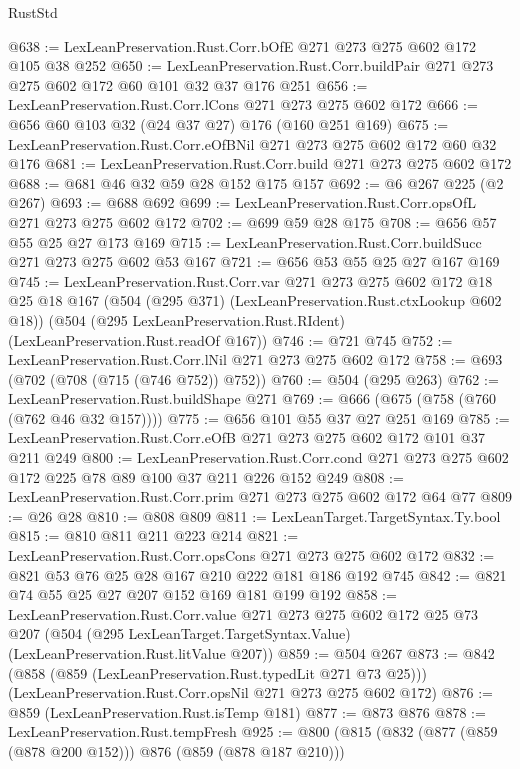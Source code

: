 \begin{lexlean}{RustStd}
\begin{coremodule}
@638 := LexLeanPreservation.Rust.Corr.bOfE @271 @273 @275 @602 @172 @105 @38 @252
@650 := LexLeanPreservation.Rust.Corr.buildPair @271 @273 @275 @602 @172 @60 @101 @32 @37 @176 @251
@656 := LexLeanPreservation.Rust.Corr.lCons @271 @273 @275 @602 @172
@666 := @656 @60 @103 @32 (@24 @37 @27) @176 (@160 @251 @169)
@675 := LexLeanPreservation.Rust.Corr.eOfBNil @271 @273 @275 @602 @172 @60 @32 @176
@681 := LexLeanPreservation.Rust.Corr.build @271 @273 @275 @602 @172
@688 := @681 @46 @32 @59 @28 @152 @175 @157
@692 := @6 @267 @225 (@2 @267)
@693 := @688 @692
@699 := LexLeanPreservation.Rust.Corr.opsOfL @271 @273 @275 @602 @172
@702 := @699 @59 @28 @175
@708 := @656 @57 @55 @25 @27 @173 @169
@715 := LexLeanPreservation.Rust.Corr.buildSucc @271 @273 @275 @602 @53 @167
@721 := @656 @53 @55 @25 @27 @167 @169
@745 := LexLeanPreservation.Rust.Corr.var
    @271
    @273
    @275
    @602
    @172
    @18
    @25
    @18
    @167
    (@504 (@295 @371) (LexLeanPreservation.Rust.ctxLookup @602 @18))
    (@504 (@295 LexLeanPreservation.Rust.RIdent) (LexLeanPreservation.Rust.readOf @167))
@746 := @721 @745
@752 := LexLeanPreservation.Rust.Corr.lNil @271 @273 @275 @602 @172
@758 := @693 (@702 (@708 (@715 (@746 @752)) @752))
@760 := @504 (@295 @263)
@762 := LexLeanPreservation.Rust.buildShape @271
@769 := @666 (@675 (@758 (@760 (@762 @46 @32 @157))))
@775 := @656 @101 @55 @37 @27 @251 @169
@785 := LexLeanPreservation.Rust.Corr.eOfB @271 @273 @275 @602 @172 @101 @37 @211 @249
@800 := LexLeanPreservation.Rust.Corr.cond
    @271
    @273
    @275
    @602
    @172
    @225
    @78
    @89
    @100
    @37
    @211
    @226
    @152
    @249
@808 := LexLeanPreservation.Rust.Corr.prim @271 @273 @275 @602 @172 @64 @77
@809 := @26 @28
@810 := @808 @809
@811 := LexLeanTarget.TargetSyntax.Ty.bool
@815 := @810 @811 @211 @223 @214
@821 := LexLeanPreservation.Rust.Corr.opsCons @271 @273 @275 @602 @172
@832 := @821 @53 @76 @25 @28 @167 @210 @222 @181 @186 @192 @745
@842 := @821 @74 @55 @25 @27 @207 @152 @169 @181 @199 @192
@858 := LexLeanPreservation.Rust.Corr.value
    @271
    @273
    @275
    @602
    @172
    @25
    @73
    @207
    (@504 (@295 LexLeanTarget.TargetSyntax.Value) (LexLeanPreservation.Rust.litValue @207))
@859 := @504 @267
@873 := @842
    (@858 (@859 (LexLeanPreservation.Rust.typedLit @271 @73 @25)))
    (LexLeanPreservation.Rust.Corr.opsNil @271 @273 @275 @602 @172)
@876 := @859 (LexLeanPreservation.Rust.isTemp @181)
@877 := @873 @876
@878 := LexLeanPreservation.Rust.tempFresh
@925 := @800
    (@815
      (@832 (@877 (@859 (@878 @200 @152))) @876 (@859 (@878 @187 @210)))

\end{coremodule}
\end{lexlean}
